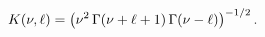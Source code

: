 \[K(\nu,\ell)=\left(\nu^{2}\mathop{\Gamma\/}\nolimits\!\left(\nu+\ell+1\right)%
\mathop{\Gamma\/}\nolimits\!\left(\nu-\ell\right)\right)^{-1/2}.\]